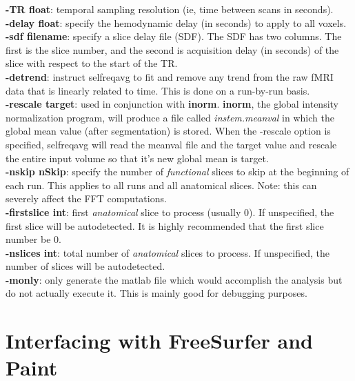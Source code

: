 \documentclass[10pt]{article}
\begin{document}
\noindent
{\bf -TR float}: temporal sampling resolution (ie, time between scans
in seconds). \\

\noindent
{\bf -delay float}: specify the hemodynamic delay (in seconds) to
apply to all voxels.\\

\noindent
{\bf -sdf filename}: specify a slice delay file (SDF).  The SDF has
two columns.  The first is the slice number, and the second is
acquisition delay (in seconds) of the slice with respect to the start
of the TR.\\

\noindent
{\bf -detrend}: instruct selfreqavg to fit and remove any trend
from the raw fMRI data that is linearly related to time.
This is done on a run-by-run basis.\\

\noindent
{\bf -rescale target}: used in conjunction with {\bf inorm}.  {\bf inorm},
the global intensity normalization program, will produce a file called
{\em instem.meanval} in which the global mean value (after
segmentation) is stored.  When the -rescale option is specified,
selfreqavg will read the meanval file and the target value and rescale
the entire input volume so that it's new global mean is target.\\

\noindent
{\bf -nskip nSkip}: specify the number of {\em functional} slices to
skip at the beginning of each run.  This applies to all runs and
all anatomical slices.  Note: this can severely affect the FFT
computations. \\

\noindent
{\bf -firstslice int}: first {\em anatomical} slice to process (usually 0).
If unspecified, the first slice will be autodetected.  It is
highly recommended that the first slice number be 0.\\

\noindent
{\bf -nslices int}: total number of {\em anatomical} slices to
process.  If unspecified, the number of slices will be autodetected.\\

\noindent
{\bf -monly}: only generate the matlab file which would accomplish the
analysis but do not actually execute it.  This is mainly good for
debugging purposes.\\

\section{Interfacing with FreeSurfer and Paint}
\end{document}
